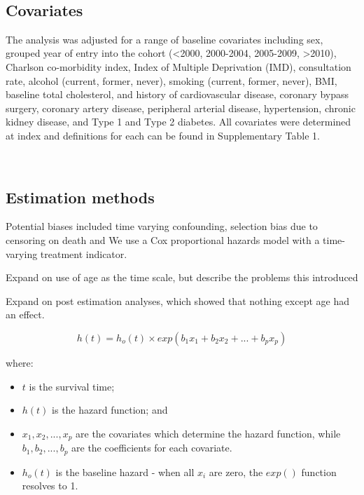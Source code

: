 \documentclass[a4paper, twoside]{templates/ociamthesis}
\providecommand{\tightlist}{%
  \setlength{\itemsep}{0pt}\setlength{\parskip}{0pt}}
\begin{document}
~

\hypertarget{covariates}{%
\subsection{Covariates}\label{covariates}}

The analysis was adjusted for a range of baseline covariates including sex, grouped year of entry into the cohort (\textless2000, 2000-2004, 2005-2009, \textgreater2010), Charlson co-morbidity index, Index of Multiple Deprivation (IMD), consultation rate, alcohol (current, former, never), smoking (current, former, never), BMI, baseline total cholesterol, and history of cardiovascular disease, coronary bypass surgery, coronary artery disease, peripheral arterial disease, hypertension, chronic kidney disease, and Type 1 and Type 2 diabetes. All
covariates were determined at index and definitions for each can be found in Supplementary Table 1.

~

\hypertarget{estimation-methods}{%
\subsection{Estimation methods}\label{estimation-methods}}

Potential biases included time varying confounding, selection bias due to censoring on death and
We use a Cox proportional hazards model with a time-varying treatment indicator.

Expand on use of age as the time scale, but describe the problems this introduced

Expand on post estimation analyses, which showed that nothing except age had an effect.

\[h(t) = h_o(t) \times exp(b_1x_1 + b_2x_2 + ... +b_px_p)\]

where:

\begin{itemize}
\tightlist
\item
  \(t\) is the survival time;
\item
  \(h(t)\) is the hazard function; and
\item
  \(x_1,x_2,...,x_p\) are the covariates which determine the hazard function, while \(b_1,b_2,...,b_p\) are the coefficients for each covariate.
\item
  \(h_o(t)\) is the baseline hazard - when all \(x_i\) are zero, the \(exp()\) function resolves to 1.
\end{itemize}
\end{document}
